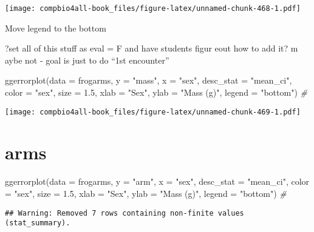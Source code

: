 \documentclass[
]{book}
\newenvironment{Shaded}{\begin{snugshade}}{\end{snugshade}}
\newcommand{\AttributeTok}[1]{\textcolor[rgb]{0.77,0.63,0.00}{#1}}
\newcommand{\CommentTok}[1]{\textcolor[rgb]{0.56,0.35,0.01}{\textit{#1}}}
\newcommand{\FloatTok}[1]{\textcolor[rgb]{0.00,0.00,0.81}{#1}}
\newcommand{\FunctionTok}[1]{\textcolor[rgb]{0.00,0.00,0.00}{#1}}
\newcommand{\NormalTok}[1]{#1}
\newcommand{\StringTok}[1]{\textcolor[rgb]{0.31,0.60,0.02}{#1}}
\begin{document}
\texttt{[image: compbio4all-book\_files/figure-latex/unnamed-chunk-468-1.pdf]}

Move legend to the bottom

?set all of this stuff as eval = F and have students figur eout how to add it?
m aybe not - goal is just to do ``1st encounter''

\begin{Shaded}
\begin{Highlighting}[]
\FunctionTok{ggerrorplot}\NormalTok{(}\AttributeTok{data =}\NormalTok{ frogarms,}
          \AttributeTok{y =} \StringTok{"mass"}\NormalTok{,}
          \AttributeTok{x =} \StringTok{"sex"}\NormalTok{,}
          \AttributeTok{desc\_stat =} \StringTok{"mean\_ci"}\NormalTok{,}
          \AttributeTok{color =} \StringTok{"sex"}\NormalTok{,}
          \AttributeTok{size =} \FloatTok{1.5}\NormalTok{,}
          \AttributeTok{xlab =} \StringTok{"Sex"}\NormalTok{,}
          \AttributeTok{ylab =} \StringTok{"Mass (g)"}\NormalTok{,}
          \AttributeTok{legend =} \StringTok{"bottom"}\NormalTok{) }\CommentTok{\#}
\end{Highlighting}
\end{Shaded}

\texttt{[image: compbio4all-book\_files/figure-latex/unnamed-chunk-469-1.pdf]}

\hypertarget{arms}{%
\section{arms}\label{arms}}

\begin{Shaded}
\begin{Highlighting}[]
\FunctionTok{ggerrorplot}\NormalTok{(}\AttributeTok{data =}\NormalTok{ frogarms,}
          \AttributeTok{y =} \StringTok{"arm"}\NormalTok{,}
          \AttributeTok{x =} \StringTok{"sex"}\NormalTok{,}
          \AttributeTok{desc\_stat =} \StringTok{"mean\_ci"}\NormalTok{,}
          \AttributeTok{color =} \StringTok{"sex"}\NormalTok{,}
          \AttributeTok{size =} \FloatTok{1.5}\NormalTok{,}
          \AttributeTok{xlab =} \StringTok{"Sex"}\NormalTok{,}
          \AttributeTok{ylab =} \StringTok{"Mass (g)"}\NormalTok{,}
          \AttributeTok{legend =} \StringTok{"bottom"}\NormalTok{) }\CommentTok{\#}
\end{Highlighting}
\end{Shaded}

\begin{verbatim}
## Warning: Removed 7 rows containing non-finite values (stat_summary).
\end{verbatim}
\end{document}
